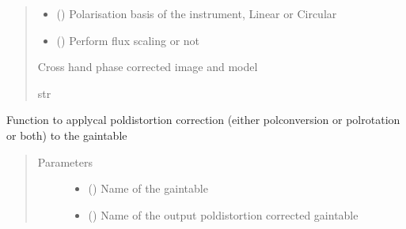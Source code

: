 \documentclass[letterpaper,10pt,english]{sphinxmanual}
\begin{document}
\begin{fulllineitems}
\begin{fulllineitems}
\begin{quote}
\begin{description}
\begin{itemize}
\item {} 
\sphinxAtStartPar
{} () \textendash{} Polarisation basis of the instrument, Linear or Circular

\item {} 
\sphinxAtStartPar
{} () \textendash{} Perform flux scaling or not

\end{itemize}

\item[{Returns}] \leavevmode
\sphinxAtStartPar
Cross hand phase corrected image and model

\item[{Return type}] \leavevmode
\sphinxAtStartPar
str

\end{description}\end{quote}

\end{fulllineitems}


\begin{fulllineitems}
\label{\detokenize{paircars:paircars.fullpol_selfcal_LTS.PolSelfcal.correct_poldistortion}}
\sphinxAtStartPar
Function to applycal poldistortion correction (either polconversion or polrotation or both) to the gaintable
\begin{quote}\begin{description}
\item[{Parameters}] \leavevmode\begin{itemize}
\item {} 
\sphinxAtStartPar
{} () \textendash{} Name of the gaintable

\item {} 
\sphinxAtStartPar
{} () \textendash{} Name of the output poldistortion corrected gaintable


\end{itemize}
\end{description}
\end{quote}
\end{fulllineitems}
\end{fulllineitems}
\end{document}
